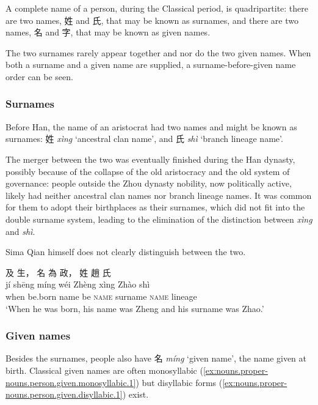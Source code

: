 \documentclass[UTF8, a4paper, oneside, scheme=plain, 12pt]{ctexrep}
\newcommand{\form}[1]{\emph{#1}}
\newcommand{\translate}[1]{`#1'}
\newcommand*{\category}[1]{\textsc{#1}}
\begin{document}
A complete name of a person, during the Classical period, is quadripartite:
there are two names, 姓 and 氏, that may be known as surnames,
and there are two names, 名 and 字, that may be known as given names.

The two surnames rarely appear together and nor do the two given names.
When both a surname and a given name are supplied,
a surname-before-given name order can be seen.

\subsubsection{Surnames}

Before Han, the name of an aristocrat had two names and might be known as surnames:
姓 \form{xìng} \translate{ancestral clan name}, and 氏 \form{shì} \translate{branch lineage name}.

The merger between the two was eventually finished during the Han dynasty,
possibly because of the collapse of the old aristocracy and the old system of governance:
people outside the Zhou dynasty nobility, now politically active,
likely had neither ancestral clan names nor branch lineage names.
It was common for them to adopt their birthplaces as their surnames,
which did not fit into the double surname system,
leading to the elimination of the distinction between \form{xìng} and \form{shì}.

Sima Qian himself does not clearly distinguish between the two.

\begin{exe}
    \ex
    \glll 及 生， 名 為 政， 姓 趙 氏 \\
    jí shēng míng wéi Zhèng xìng Zhào shì \\
    when be.born name be \category{name} surname \category{name} lineage \\
    \glt\translate{When he was born, his name was Zheng and his surname was Zhao.}
\end{exe}

\subsubsection{Given names}\label{sec:nouns.proper-nouns.person-names.given-names}

Besides the surnames, people also have 名 \form{míng} \translate{given name},
the name given at birth.
Classical given names are often monosyllabic (\ref{ex:nouns.proper-nouns.person.given.monosyllabic.1}) but disyllabic forms (\ref{ex:nouns.proper-nouns.person.given.disyllabic.1}) exist.
\end{document}
